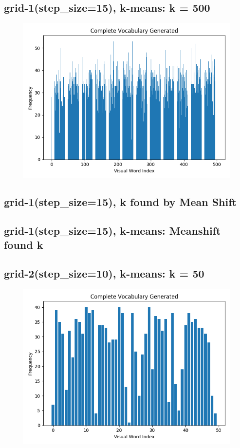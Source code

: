 \subsection*{grid-1(step\_size=15), k-means: k = 500}
\begin{figure}[H]
    \centering
    \includegraphics[width=\textwidth]{images/bow-stp-15-500.png}
\end{figure}

\subsection*{grid-1(step\_size=15), k found by Mean Shift}
\subsection*{grid-1(step\_size=15), k-means: Meanshift found k}

\subsection*{grid-2(step\_size=10), k-means: k = 50}
\begin{figure}[H]
    \centering
    \includegraphics[width=\textwidth]{images/bow-stp-10-50.png}
\end{figure}

